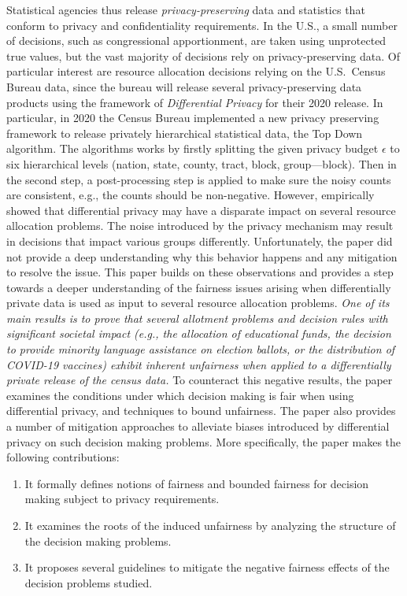 \documentclass[9pt,twocolumn,twoside,lineno]{pnas-new}
\begin{document}
Statistical agencies thus release \emph{privacy-preserving} data and
statistics that conform to privacy and confidentiality requirements.
In the U.S., a small number of decisions, such as congressional
apportionment, are taken using unprotected true values, but the vast
majority of decisions rely on privacy-preserving data. Of particular
interest are resource allocation decisions relying on the U.S.~Census
Bureau data, since the bureau will release several privacy-preserving 
data products using the framework of \emph{Differential Privacy} \cite{abowd2018us}
for their 2020 release. In particular, in  2020 the Census Bureau implemented a new privacy preserving framework to release privately hierarchical statistical data, the Top Down algorithm. The algorithms works by firstly splitting the given privacy budget $\epsilon$ to six hierarchical levels (nation, state, county, tract, block, group—block). Then in the second step, a post-processing step is applied to make sure the noisy counts are consistent, e.g., the counts should be non-negative. 
However, \cite{pujol:20} empirically showed
that differential privacy may have a disparate impact on several
resource allocation problems. The noise introduced by the privacy
mechanism may result in decisions that impact various groups
differently. Unfortunately, the paper did not provide a deep understanding why this behavior happens and any mitigation to resolve the issue. This paper builds on these observations and provides a step towards a
deeper understanding of the fairness issues arising when
differentially private data is used as input to several resource
allocation problems.  {\em One of its main results is to prove that
  several allotment problems and decision rules with significant
  societal impact (e.g., the allocation of educational funds, the
  decision to provide minority language assistance on election
  ballots, or the distribution of COVID-19 vaccines) exhibit inherent
  unfairness when applied to a differentially private release of the census
  data.} To counteract this negative results, the paper examines the
conditions under which decision making is fair when using differential
privacy, and techniques to bound unfairness. The paper also provides a
number of mitigation approaches to alleviate biases introduced by
differential privacy on such decision making problems. More
specifically, the paper makes the following contributions:
\begin{enumerate}[leftmargin=*,labelsep=2pt,itemsep=0pt,parsep=2pt,topsep=2pt]

\item It formally defines notions of fairness and bounded fairness for decision making
  subject to privacy requirements. 

\item It examines the roots of the induced unfairness by analyzing the structure
  of the decision making problems. 

\item It proposes several guidelines to mitigate the negative
  fairness effects of the decision problems studied.  
\end{enumerate}
\end{document}
